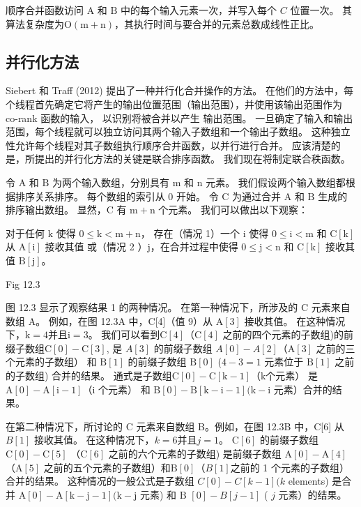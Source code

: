顺序合并函数访问 $\mathrm{A}$ 和 $\mathrm{B}$ 中的每个输入元素一次，并写入每个 $C$ 位置一次。 
其算法复杂度为$\mathrm{O}(\mathrm{m}+\mathrm{n})$，其执行时间与要合并的元素总数成线性正比。

\subsection{并行化方法}
Siebert 和 Traff (2012) 提出了一种并行化合并操作的方法。 
在他们的方法中，每个线程首先确定它将产生的输出位置范围（输出范围），并使用该输出范围作为 co-rank 函数的输入，
以识别将被合并以产生 输出范围。 一旦确定了输入和输出范围，每个线程就可以独立访问其两个输入子数组和一个输出子数组。 
这种独立性允许每个线程对其子数组执行顺序合并函数，以并行进行合并。 
应该清楚的是，所提出的并行化方法的关键是联合排序函数。 我们现在将制定联合秩函数。

令 $\mathrm{A}$ 和 $\mathrm{B}$ 为两个输入数组，分别具有 $\mathrm{m}$ 和 $\mathrm{n}$ 元素。 
我们假设两个输入数组都根据排序关系排序。 每个数组的索引从 0 开始。 
令 $\mathrm{C}$ 为通过合并 $\mathrm{A}$ 和 $\mathrm{B}$ 生成的排序输出数组。 
显然，$\mathrm{C}$ 有 $\mathrm{m}+\mathrm{n}$ 个元素。 我们可以做出以下观察：

\begin{Observation}
对于任何 $\mathrm{k}$ 使得 $0 \leq \mathrm{k}<\mathrm{m}+\mathrm{n}$，
存在（情况 1）一个 $\mathrm{i} $ 使得 $0 \leq \mathrm{i}<\mathrm{m}$ 
和 $\mathrm{C}[\mathrm{k}]$ 从 $\mathrm{A}[\mathrm{i}]$ 接收其值
或（情况 2 ）$\mathrm{j}$，在合并过程中使得 $0 \leq \mathrm{j}<\mathrm{n}$ 
和 $\mathrm{C}[\mathrm{k}]$ 接收其值 $\mathrm{B}[\mathrm{j}]$。
\end{Observation}

{\color{red} Fig 12.3}

图 12.3 显示了观察结果 1 的两种情况。 在第一种情况下，所涉及的 $\mathrm{C}$ 元素来自数组 A。
例如，在图 12.3A 中，C[4]（值 9）从 $\mathrm{A}[3]$ 接收其值。 
在这种情况下，$\mathrm{k}=4$并且$\mathrm{i}=3$。 
我们可以看到$\mathrm{C}[4]$（$\mathrm{C}[4]$ 之前的四个元素的子数组)的前缀子数组$\mathrm{C}[0]-\mathrm{C}[3]$, 
是 $A[3]$ 的前缀子数组 $A[0]-A[2]$（$\mathrm{A}[3]$ 之前的三个元素的子数组）
和 $\mathrm{B}[1]$ 的前缀子数组 $\mathrm{B}[0]$ ($4-3=1$ 元素位于 $\mathrm{B}[1]$ 之前的子数组) 合并的结果。 
通式是子数组$\mathrm{C}[0]-\mathrm{C}[\mathrm{k}-1]$（k个元素）
是$\mathrm{A}[0]-\mathrm{A}[\mathrm{i}-1]$（i 个元素）
和 $\mathrm{B}[0]-\mathrm{B}[\mathrm{k}-\mathrm{i}-1] (\mathrm{k}-\mathrm{i}$ 元素）合并的结果。

在第二种情况下，所讨论的 $\mathrm{C}$ 元素来自数组 B。例如，在图 12.3B 中，C[6] 从 $B[1]$ 接收其值。 
在这种情况下，$k=6$并且$j=1$。 $\mathrm{C}[6]$ 的前缀子数组 $\mathrm{C}[0]-\mathrm{C}[5]$ 
（$\mathrm{C}[6]$ 之前的六个元素的子数组) 是前缀子数组 $\mathrm{A}[0]-\mathrm{A}[4]$ 
（$\mathrm{A}[5]$ 之前的五个元素的子数组）和$\mathrm{B}[0]$（$B[1]$之前的 1 个元素的子数组）合并的结果。 
这种情况的一般公式是子数组 $C[0]-C[k-1](k$ elements) 是合并 $\mathrm{A}[0]-\mathrm{A}[\mathrm{ k}-\mathrm{j}-1](\mathrm{k}-\mathrm{j}$ 元素) 和 $\mathrm{B}$ $[0]-B[j-1]$ ( $j$ 元素）的结果。

